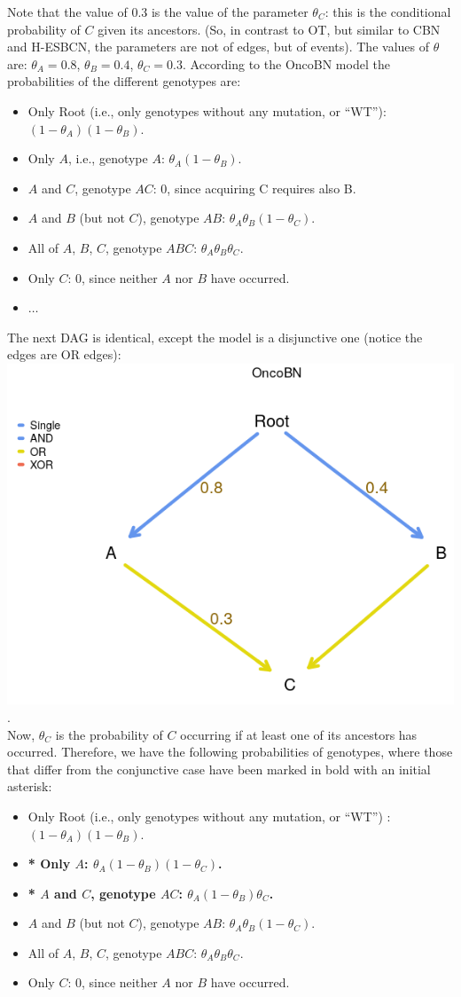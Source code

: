 \documentclass[a4paper,11pt]{article}
\begin{document}
Note that the value of 0.3 is the value of the parameter $\theta_C$: this is the conditional probability of $C$ given its ancestors. (So, in contrast to OT, but similar to CBN and H-ESBCN, the parameters are not of edges, but of events). The values of $\theta$ are: $\theta_A = 0.8$, $\theta_B = 0.4$, $\theta_C = 0.3$. According to the OncoBN model the probabilities of the different  genotypes are:

\begin{itemize}
\item Only Root (i.e., only genotypes without any mutation, or ``WT''): $(1 - \theta_A) (1 - \theta_B)$.
\item Only $A$, i.e., genotype $A$: $\theta_A (1 - \theta_B)$.
\item $A$ and $C$, genotype $AC$: 0, since acquiring C requires also B.
\item $A$ and $B$ (but not $C$), genotype $AB$: $\theta_A \theta_B (1 - \theta_C)$.
\item All of $A$, $B$, $C$, genotype $ABC$:  $\theta_A \theta_B \theta_C$.
\item Only $C$: 0, since neither $A$ nor $B$ have occurred.
  \item $\ldots$
\end{itemize}


The next DAG is identical, except the model is a disjunctive one (notice the edges are OR edges):\\

\includegraphics[width=.45\linewidth]{./oncobn_d1.png}.\\

Now, $\theta_C$ is the probability of $C$ occurring if at least one of its ancestors has occurred. Therefore, we have the following probabilities of  genotypes, where those that differ from the conjunctive case have been marked in bold with an initial asterisk:

\begin{itemize}
\item Only Root (i.e., only genotypes without any mutation, or ``WT'') : $(1 - \theta_A) (1 - \theta_B)$.
\item \textbf{* Only $A$: $\theta_A (1 - \theta_B) (1 - \theta_C)$.}
\item \textbf{* $A$ and $C$, genotype $AC$: $\theta_A (1 - \theta_B) \theta_C$.}
\item $A$ and $B$ (but not $C$), genotype $AB$: $\theta_A \theta_B (1 - \theta_C)$.
\item All of $A$, $B$, $C$, genotype $ABC$:  $\theta_A \theta_B \theta_C$.
\item Only $C$: 0, since neither $A$ nor $B$ have occurred.
\end{itemize}
\end{document}
